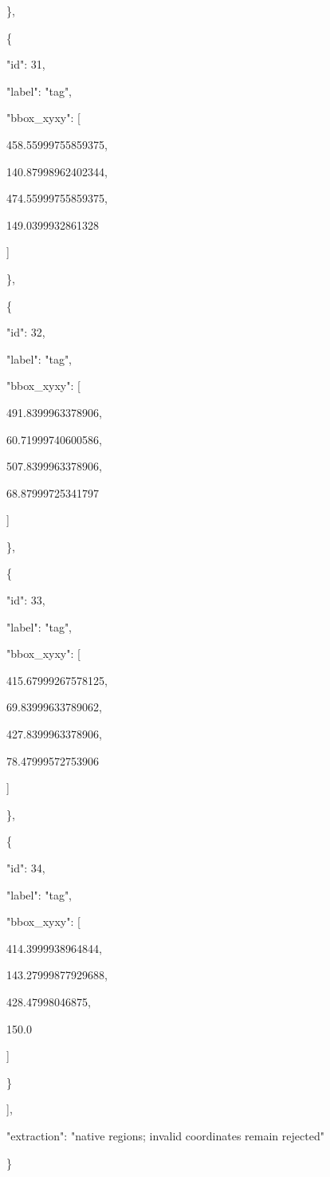 \documentclass[10pt,a4paper]{article}
\begin{document}
    \},\allowbreak{}\par
    \{\par
      "id":\allowbreak{} 31,\allowbreak{}\par
      "label":\allowbreak{} "tag",\allowbreak{}\par
      "bbox\_xyxy":\allowbreak{} [\par
        458.55999755859375,\allowbreak{}\par
        140.87998962402344,\allowbreak{}\par
        474.55999755859375,\allowbreak{}\par
        149.0399932861328\par
      ]\par
    \},\allowbreak{}\par
    \{\par
      "id":\allowbreak{} 32,\allowbreak{}\par
      "label":\allowbreak{} "tag",\allowbreak{}\par
      "bbox\_xyxy":\allowbreak{} [\par
        491.8399963378906,\allowbreak{}\par
        60.71999740600586,\allowbreak{}\par
        507.8399963378906,\allowbreak{}\par
        68.87999725341797\par
      ]\par
    \},\allowbreak{}\par
    \{\par
      "id":\allowbreak{} 33,\allowbreak{}\par
      "label":\allowbreak{} "tag",\allowbreak{}\par
      "bbox\_xyxy":\allowbreak{} [\par
        415.67999267578125,\allowbreak{}\par
        69.83999633789062,\allowbreak{}\par
        427.8399963378906,\allowbreak{}\par
        78.47999572753906\par
      ]\par
    \},\allowbreak{}\par
    \{\par
      "id":\allowbreak{} 34,\allowbreak{}\par
      "label":\allowbreak{} "tag",\allowbreak{}\par
      "bbox\_xyxy":\allowbreak{} [\par
        414.3999938964844,\allowbreak{}\par
        143.27999877929688,\allowbreak{}\par
        428.47998046875,\allowbreak{}\par
        150.0\par
      ]\par
    \}\par
  ],\allowbreak{}\par
  "extraction":\allowbreak{} "native regions; invalid coordinates remain rejected"\par
\}
\end{document}
